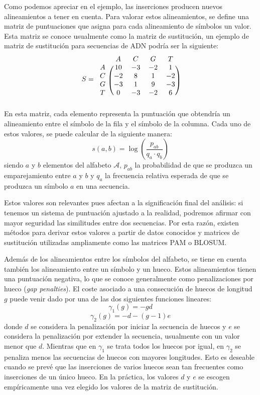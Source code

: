 Como podemos apreciar en el ejemplo, las inserciones producen nuevos alineamientos a tener en cuenta. Para valorar estos alineamientos, se define una matriz de puntuaciones que asigna para cada alineamiento de símbolos un valor. Esta matriz se conoce usualmente como la matriz de sustitución, un ejemplo de matriz de sustitución para secuencias de ADN podría ser la siguiente:
\[
S=\begin{blockarray}{ccccc}
 & A & C & G & T \\
\begin{block}{c(cccc)}
  A & 10 & -3 & -2 & 1 \\
  C & -2 & 8 & 1 & -2 \\
  G & -3 & 1 & 9 & -3 \\
  T & 0 & -3 & -2 & 6\\
\end{block}
\end{blockarray}
 \]
En esta matriz, cada elemento representa la puntuación que obtendría un alineamiento entre el símbolo de la fila y el símbolo de la columna. Cada uno de estos valores, se puede calcular de la siguiente manera:
\[s(a,b)=\log\left(\dfrac{p_{ab}}{q_a\cdot q_b}\right)\]
siendo $a$ y $b$ elementos del alfabeto $\mathcal{A}$, $p_{ab}$ la probabilidad de que se produzca un emparejamiento entre $a$ y $b$ y $q_a$ la frecuencia relativa esperada de que se produzca un símbolo $a$ en una secuencia. 

Estos valores son relevantes pues afectan a la significación final del análisis: si tenemos un sistema de puntuación ajustado a la realidad, podremos afirmar con mayor seguridad las similitudes entre dos secuencias. Por esta razón, existen métodos para derivar estos valores a partir de datos conocidos y matrices de sustitución utilizadas ampliamente como las matrices PAM o BLOSUM.

Además de los alineamientos entre los símbolos del alfabeto, se tiene en cuenta también los alineamiento entre un símbolo y un hueco. Estos alineamientos tienen una puntuación negativa, lo que se conoce generalmente como penalizaciones por hueco (\textit{gap penalties}). El coste asociado a una consecución de huecos de longitud $g$ puede venir dado por una de las dos siguientes funciones lineares:
\[\gamma_1(g)=-gd \]
\[\gamma_2(g)=-d-(g-1)e\]
donde $d$ se considera la penalización por iniciar la secuencia de huecos y $e$ se considera la penalización por extender la secuencia, usualmente con un valor menor que $d$. Mientras que en $\gamma_1$ se trata todos los huecos por igual, en $\gamma_2$ se penaliza menos las secuencias de huecos con mayores longitudes. Esto es deseable cuando se prevé que las inserciones de varios huecos sean tan frecuentes como inserciones de un único hueco. En la práctica, los valores $d$ y $e$ se escogen empíricamente una vez elegido los valores de la matriz de sustitución.

